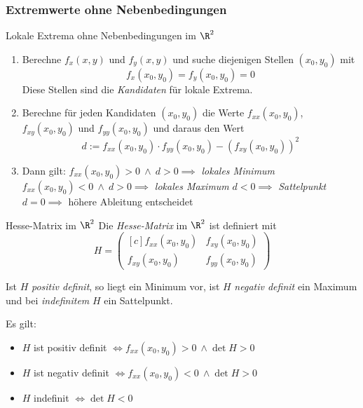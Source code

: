 \documentclass[german]{../spicker}
\newcommand{\vektor}[1]{\begin{pmatrix*}[c] #1 \end{pmatrix*}}
\begin{document}
\subsubsection{Extremwerte ohne Nebenbedingungen}

\begin{algo}{Lokale Extrema ohne Nebenbedingungen im $\R^2$}
    \begin{enumerate}
        \item Berechne $f_x(x,y)$ und $f_y(x, y)$ und suche diejenigen Stellen $(x_0, y_0)$ mit
              $$
                  f_x(x_0, y_0) = f_y(x_0, y_0) = 0
              $$
              Diese Stellen sind die \emph{Kandidaten} für lokale Extrema.
        \item Berechne für jeden Kandidaten $(x_0, y_0)$ die Werte $f_{xx}(x_0, y_0)$, $f_{xy}(x_0, y_0)$ und $f_{yy}(x_0, y_0)$ und daraus den Wert
              $$
                  d := f_{xx}(x_0, y_0) \cdot f_{yy}(x_0, y_0) - \left(f_{xy}(x_0, y_0)\right)^2
              $$
        \item Dann gilt:
              \subitem $f_{xx}(x_0, y_0) > 0 \ \land \ d > 0 \implies$ \emph{lokales Minimum}
              \subitem $f_{xx}(x_0, y_0) < 0 \ \land \ d > 0 \implies$ \emph{lokales Maximum}
              \subitem $d < 0 \implies$ \emph{Sattelpunkt}
              \subitem $d = 0 \implies$ höhere Ableitung entscheidet
    \end{enumerate}
\end{algo}

\begin{defi}{Hesse-Matrix im $\R^2$}
    Die \emph{Hesse-Matrix} im $\R^2$ ist definiert mit
    $$
        H = \vektor{f_{xx}(x_0, y_0) & f_{xy}(x_0, y_0) \\ f_{xy}(x_0, y_0) & f_{yy}(x_0, y_0)}
    $$

    Ist $H$ \emph{positiv definit}, so liegt ein Minimum vor, ist $H$ \emph{negativ definit} ein Maximum und bei \emph{indefinitem} $H$ ein Sattelpunkt.

    Es gilt:
    \begin{itemize}
        \item $H$ ist positiv definit $\iff f_{xx}(x_0, y_0) > 0 \ \land \det H > 0$
        \item $H$ ist negativ definit $\iff f_{xx}(x_0, y_0) < 0 \ \land \det H > 0$
        \item $H$ indefinit $\iff \det H < 0$
    \end{itemize}
\end{defi}
\end{document}
